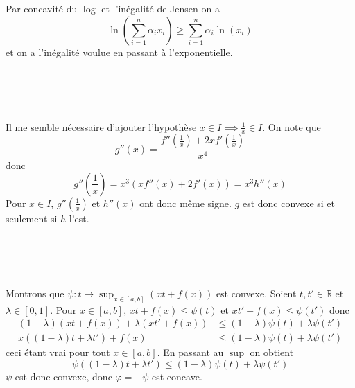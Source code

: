 \documentclass{report}
\begin{document}
\subsection{} \noindent{}\\ 
\\ 
\\
\noindent Par concavité du $\log$ et l'inégalité de Jensen on a $$\ln\left( \sum_{i=1}^n\alpha_i x_i \right)\geq \sum_{i=1}^n \alpha_i \ln(x_i)$$
et on a l'inégalité voulue en passant à l'exponentielle.

\subsection{} \noindent{}\\ 
\\ 
\\
\noindent Il me semble nécessaire d'ajouter l'hypothèse $x\in I \implies \frac{1}{x}\in I$.\newline \newline
On note que $$g''(x) = \frac{f''(\frac{1}{x}) + 2xf'(\frac{1}{x})}{x^4}$$
donc 
$$g''(\frac{1}{x}) = x^3 (xf''(x)+2f'(x)) = x^3 h''(x)$$
Pour $x\in I$, $g''(\frac{1}{x})$ et $h''(x)$ ont donc même signe. $g$ est donc convexe si et seulement si $h$ l'est.

\subsection{} \noindent{}\\ 
\\ 
\\
\noindent Montrons que $\psi:t\mapsto \sup_{x\in [a,b]}(xt + f(x))$ est convexe.\newline
Soient $t,t' \in \mathbb R$ et $\lambda \in [0,1]$. Pour $x\in [a,b]$, $xt+f(x)\leq \psi(t)$ et $xt'+f(x)\leq \psi(t')$ donc $$ \begin{aligned}(1-\lambda)(xt+f(x)) + \lambda(xt'+f(x)) &\leq (1-\lambda) \psi(t) + \lambda \psi(t')\\
x((1-\lambda)t + \lambda t') + f(x)&\leq (1-\lambda) \psi(t) + \lambda \psi(t') \end{aligned}$$
ceci étant vrai pour tout $x\in [a,b]$. En passant au $\sup$ on obtient $$\psi((1-\lambda)t + \lambda t')\leq (1-\lambda) \psi(t) + \lambda \psi(t')$$
$\psi$ est donc convexe, donc $\varphi=-\psi$ est concave.
\end{document}
